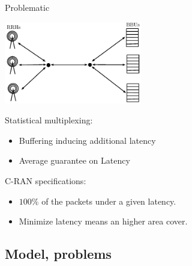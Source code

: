 \documentclass[10 pt]{beamer}
\begin{document}
\begin{frame}{Problematic}
  \centering
  
  \begin{center}
  \includegraphics [width=6cm]{modelstar} 
\end{center}

 \begin{multicols}{2}
Statistical multiplexing:


\begin{itemize}
\item Buffering inducing additional latency
\item Average guarantee on Latency
\end{itemize}
\vspace{2cm}

C-RAN specifications:
 \begin{itemize}
\item $100\%$ of the packets under a given latency.
\item Minimize latency means an higher area cover.
\end{itemize}

\end{multicols}

\end{frame}


\subsection{Model, problems}
 
\end{document}
